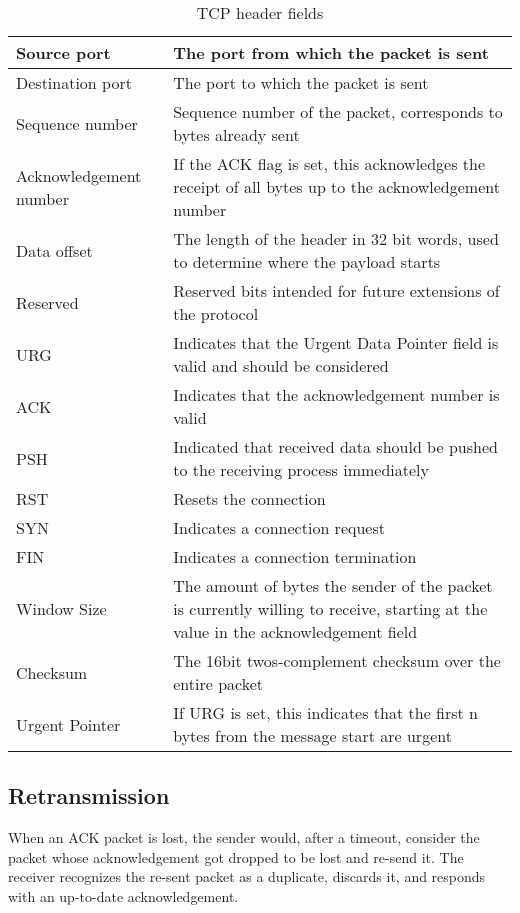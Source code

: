\documentclass[a4paper, 11 pt, article, accentcolor=tud7b]{tudreport}
\begin{document}
	\begin{table}[h]
	  \centering
	  \begin{tabularx}{\linewidth}{|l|X|}
	    \hline
	    Source port & The port from which the packet is sent \\ \hline
	    Destination port & The port to which the packet is sent \\ \hline
	    Sequence number & Sequence number of the packet, corresponds to bytes already sent \\ \hline
	    Acknowledgement number & If the ACK flag is set, this acknowledges the receipt of all bytes up to the acknowledgement number \\ \hline
	    Data offset & The length of the header in 32 bit words, used to determine where the payload starts \\ \hline
	    Reserved & Reserved bits intended for future extensions of the protocol \\ \hline
	    URG & Indicates that the Urgent Data Pointer field is valid and should be considered \\ \hline
	    ACK & Indicates that the acknowledgement number is valid \\ \hline
	    PSH & Indicated that received data should be pushed to the receiving process immediately \\ \hline
	    RST & Resets the connection \\ \hline
	    SYN & Indicates a connection request \\ \hline
	    FIN & Indicates a connection termination \\ \hline
	    Window Size & The amount of bytes the sender of the packet is currently willing to receive, starting at the value in the acknowledgement field \\ \hline
	    Checksum & The 16bit twos-complement checksum over the entire packet \\ \hline
	    Urgent Pointer & If URG is set, this indicates that the first n bytes from the message start are urgent \\ \hline
	  \end{tabularx}
	  \caption{TCP header fields}
	\end{table}
	
	\subsection*{Retransmission}
	When an ACK packet is lost, the sender would, after a timeout, consider the packet whose acknowledgement got dropped to be lost and re-send it. The receiver recognizes the re-sent packet as a duplicate, discards it, and responds with an up-to-date acknowledgement.
	
\end{document}
